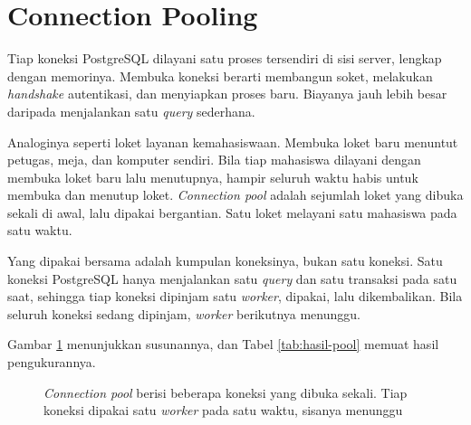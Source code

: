 \section{Connection Pooling}

Tiap koneksi PostgreSQL dilayani satu proses tersendiri di sisi server, lengkap
dengan memorinya. Membuka koneksi berarti membangun soket, melakukan
\textit{handshake} autentikasi, dan menyiapkan proses baru. Biayanya jauh lebih
besar daripada menjalankan satu \textit{query} sederhana.

Analoginya seperti loket layanan kemahasiswaan. Membuka loket baru menuntut
petugas, meja, dan komputer sendiri. Bila tiap mahasiswa dilayani dengan
membuka loket baru lalu menutupnya, hampir seluruh waktu habis untuk membuka
dan menutup loket. \textit{Connection pool} adalah sejumlah loket yang dibuka sekali di
awal, lalu dipakai bergantian. Satu loket melayani satu mahasiswa pada satu
waktu.

Yang dipakai bersama adalah kumpulan koneksinya, bukan satu koneksi. Satu
koneksi PostgreSQL hanya menjalankan satu \textit{query} dan satu transaksi pada satu
saat, sehingga tiap koneksi dipinjam satu \textit{worker}, dipakai, lalu
dikembalikan. Bila seluruh koneksi sedang dipinjam, \textit{worker} berikutnya
menunggu.

Gambar \ref{fig:pool} menunjukkan susunannya, dan Tabel \ref{tab:hasil-pool}
memuat hasil pengukurannya.

\begin{figure}[!htb]
  \centering
  \caption{\textit{Connection pool} berisi beberapa koneksi yang dibuka sekali.
           Tiap koneksi dipakai satu \textit{worker} pada satu waktu, sisanya
           menunggu}
  \label{fig:pool}
\end{figure}

